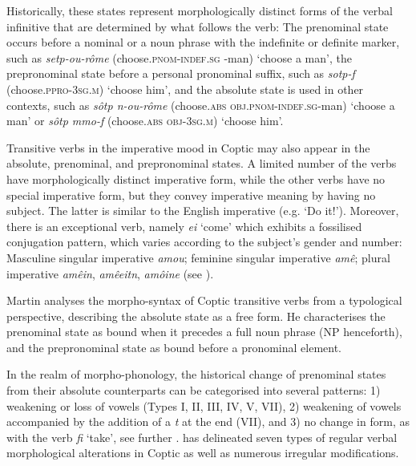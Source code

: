 \documentclass[output=paper,colorlinks,citecolor=brown ,chinesefont]{langscibook}
\begin{document}
Historically, these states represent morphologically distinct forms of the verbal infinitive that are determined by what follows the verb: The prenominal state occurs before a nominal or a noun phrase with the indefinite or definite marker, such as  \textit{setp-ou-rôme} (choose.\textsc{pnom-indef.sg} -man) ‘choose a man’, the prepronominal state before a personal pronominal suffix, such as  \textit{sotp-f} (choose.\textsc{ppro-3sg.m})  ‘choose him’, and the absolute state is used in other contexts, such as  \textit{sôtp n-ou-rôme} (choose.\textsc{abs obj.pnom-indef.sg}-man) ‘choose a man’ or  \textit{sôtp mmo-f} (choose.\textsc{abs obj-3sg.m}) ‘choose him'.


\largerpage
Transitive verbs in the imperative mood in Coptic may also appear in the absolute, prenominal, and prepronominal states. 
A limited number of the verbs have morphologically distinct imperative form, while the other verbs have no special imperative form, but they convey imperative meaning by having no subject. The latter is similar to the English imperative (e.g. ‘Do it!’).
Moreover, there is an exceptional verb, namely  \textit{ei} ‘come' which exhibits a fossilised conjugation pattern, which varies according to the subject's gender and number: Masculine singular imperative  \textit{amou}; feminine singular imperative  \textit{amê}; plural imperative  \textit{amêin},  \textit{amêeitn},  \textit{amôine} (see \citealt[7b]{crum}).

Martin \citet{haspelmath} analyses the morpho-syntax of Coptic transitive verbs from a typological perspective, describing the absolute state as a free form. He characterises the prenominal state as bound when it precedes a full noun phrase (NP henceforth), and the prepronominal state as bound before a pronominal element.

In the realm of morpho-phonology, the historical change of prenominal states from their absolute counterparts can be categorised into several patterns: 1) weakening or loss of vowels (Types I, II, III, IV, V, VII), 2) weakening of vowels accompanied by the addition of a  \textit{t} at the end (VII), and 3) no change in form, as with the verb \textit{fi} ‘take', see further . \citet[152]{layton1} has delineated seven types of regular verbal morphological alterations in Coptic as well as numerous irregular modifications.
\end{document}
